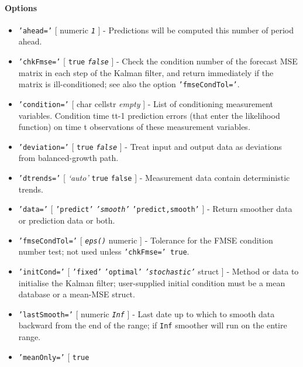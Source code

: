  \paragraph{Options}
 
 \begin{itemize}
 \item
   \texttt{'ahead='} {[} numeric \textbar{} \emph{\texttt{1}} {]} -
   Predictions will be computed this number of period ahead.
 \item
   \texttt{'chkFmse='} {[} \texttt{true} \textbar{} \emph{\texttt{false}}
   {]} - Check the condition number of the forecast MSE matrix in each
   step of the Kalman filter, and return immediately if the matrix is
   ill-conditioned; see also the option \texttt{'fmseCondTol='}.
 \item
   \texttt{'condition='} {[} char \textbar{} cellstr \textbar{}
   \emph{empty} {]} - List of conditioning measurement variables.
   Condition time t\textbar{}t-1 prediction errors (that enter the
   likelihood function) on time t observations of these measurement
   variables.
 \item
   \texttt{'deviation='} {[} \texttt{true} \textbar{}
   \emph{\texttt{false}} {]} - Treat input and output data as deviations
   from balanced-growth path.
 \item
   \texttt{'dtrends='} {[} \emph{`auto'} \textbar{} \texttt{true}
   \textbar{} \texttt{false} {]} - Measurement data contain deterministic
   trends.
 \item
   \texttt{'data='} {[} \texttt{'predict'} \textbar{}
   \emph{\texttt{'smooth'}} \textbar{} \texttt{'predict,smooth'} {]} -
   Return smoother data or prediction data or both.
 \item
   \texttt{'fmseCondTol='} {[} \emph{\texttt{eps()}} \textbar{} numeric
   {]} - Tolerance for the FMSE condition number test; not used unless
   \texttt{'chkFmse=' true}.
 \item
   \texttt{'initCond='} {[} \texttt{'fixed'} \textbar{}
   \texttt{'optimal'} \textbar{} \emph{\texttt{'stochastic'}} \textbar{}
   struct {]} - Method or data to initialise the Kalman filter;
   user-supplied initial condition must be a mean database or a mean-MSE
   struct.
 \item
   \texttt{'lastSmooth='} {[} numeric \textbar{} \emph{\texttt{Inf}} {]}
   - Last date up to which to smooth data backward from the end of the
   range; if \texttt{Inf} smoother will run on the entire range.
 \item
   \texttt{'meanOnly='} {[} \texttt{true} \textbar{}

\end{itemize}
